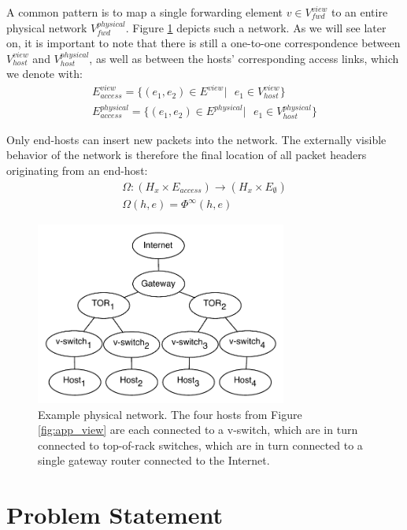 \documentclass{sig-alternate-10pt}
\begin{document}
A common pattern is to map a single forwarding element $v \in V_{fwd}^{view}$ to
an entire physical network $V_{fwd}^{physical}$. Figure \ref{fig:physical_view} depicts such a network.
As we will see later on, it is important to note that there is still a one-to-one correspondence
between $V_{host}^{view}$ and $V_{host}^{physical}$, as well as between the hosts' corresponding
access links, which we denote with:
\begin{align*}
E_{access}^{view} = \{ (e_1,e_2) \in E^{view} |\text{ } e_1 \in V_{host}^{view} \} \\
E_{access}^{physical} = \{ (e_1,e_2) \in E^{physical} |\text{ } e_1 \in V_{host}^{physical} \}
\end{align*}

Only end-hosts can insert new packets into the network. The
externally visible behavior of the network is therefore
the final location of all packet headers originating from an end-host:
\begin{align*}
\Omega: (H_{x} \times E_{access}) \rightarrow (H_{x} \times E_{\emptyset}) \\
\Omega(h,e) = \Phi^{\infty}(h,e)
\end{align*}

\begin{figure}[t]
    \hspace{-10pt}
    \includegraphics[width=3.25in]{../diagrams/necula_views/physical_view.pdf}
    \caption[]{\label{fig:physical_view} Example physical network. The four
    hosts from Figure \ref{fig:app_view} are each connected to a v-switch,
    which are in turn connected to top-of-rack switches, which are in turn
    connected to a single gateway router connected to the Internet.}
\end{figure}

\section{Problem Statement}
\end{document}
